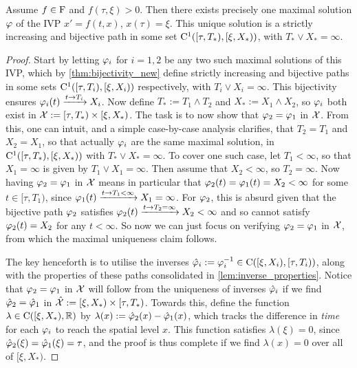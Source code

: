 \begin{theorem}\label{thm:global_uniqueness}
    Assume $f\in\mathrm{F}$ and $f(\tau,\xi)>0$. Then there exists precisely one maximal solution $\varphi$ of the IVP $x'=f(t,x)$, $x(\tau)=\xi$. This unique solution is a strictly increasing and bijective path in some set $\mathrm{C}^1([\tau,T_*),[\xi,X_*))$, with $T_*\vee X_*=\infty$.
\end{theorem}
\begin{proof}
    Start by letting $\varphi_i$ for $i=1,2$ be any two such maximal solutions of this IVP, which by \autoref{thm:bijectivity_new} define strictly increasing and bijective paths in some sets $\mathrm{C}^1([\tau,T_i),[\xi,X_i))$ respectively, with $T_i\vee X_i=\infty$. This bijectivity ensures $\varphi_i(t)\xrightarrow{t\to T_i}X_i$. Now define $T_*:=T_1\wedge T_2$ and $X_*:=X_1\wedge X_2$, so $\varphi_i$ both exist in $\mathcal{X}:=[\tau,T_*)\times[\xi,X_*)$. The task is to now show that $\varphi_2=\varphi_1$ in $\mathcal{X}$. From this, one can intuit, and a simple case-by-case analysis clarifies, that $T_2=T_1$ and $X_2=X_1$, so that actually $\varphi_i$ are the same maximal solution, in $\mathrm{C}^1([\tau,T_*),[\xi,X_*))$ with $T_*\vee X_*=\infty$. To cover one such case, let $T_1<\infty$, so that $X_1=\infty$ is given by $T_1\vee X_1=\infty$. Then assume that $X_2<\infty$, so $T_2=\infty$. Now having $\varphi_2=\varphi_1$ in $\mathcal{X}$ means in particular that $\varphi_2(t)=\varphi_1(t)=X_2<\infty$ for some $t\in[\tau,T_1)$, since $\varphi_1(t)\xrightarrow{t\to T_1<\infty}X_1=\infty$. For $\varphi_2$, this is absurd given that the bijective path $\varphi_2$ satisfies $\varphi_2(t)\xrightarrow{t\to T_2=\infty}X_2<\infty$ and so cannot satisfy $\varphi_2(t)=X_2$ for any $t<\infty$. So now we can just focus on verifying $\varphi_2=\varphi_1$ in $\mathcal{X}$, from which the maximal uniqueness claim follows.

    The key henceforth is to utilise the inverses $\hat{\varphi}_i:=\varphi_i^{-1}\in\mathrm{C}([\xi,X_i),[\tau,T_i))$, along with the properties of these paths consolidated in \autoref{lem:inverse_properties}. Notice that $\varphi_2=\varphi_1$ in $\mathcal{X}$ will follow from the uniqueness of inverses $\hat{\varphi}_i$ if we find $\hat{\varphi}_2=\hat{\varphi}_1$ in $\hat{\mathcal{X}}:=[\xi,X_*)\times[\tau,T_*)$. Towards this, define the function $\lambda\in \mathrm{C}([\xi,X_*),\mathbb{R})$ by $\lambda(x):=\hat{\varphi}_2(x)-\hat{\varphi}_1(x)$, which tracks the difference in \emph{time} for each $\varphi_i$ to reach the spatial level $x$. This function satisfies $\lambda(\xi)=0$, since $\hat{\varphi}_2(\xi)=\hat{\varphi}_1(\xi)=\tau$, and the proof is thus complete if we find $\lambda(x)=0$ over all of $[\xi,X_*)$.


\end{proof}
